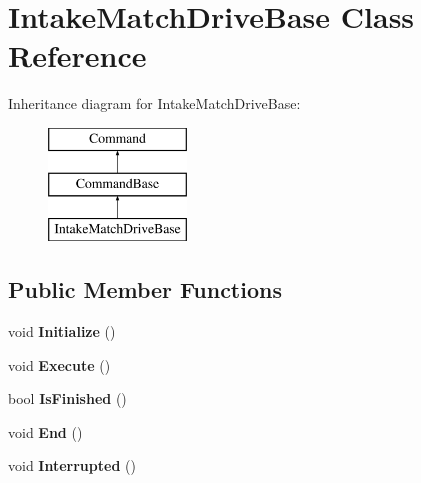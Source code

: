 \hypertarget{class_intake_match_drive_base}{}\section{Intake\+Match\+Drive\+Base Class Reference}
\label{class_intake_match_drive_base}
Inheritance diagram for Intake\+Match\+Drive\+Base\+:\begin{figure}[H]
\begin{center}
\leavevmode
\includegraphics[height=3.000000cm]{class_intake_match_drive_base}
\end{center}
\end{figure}
\subsection*{Public Member Functions}
\begin{DoxyCompactItemize}
\item 
\hypertarget{class_intake_match_drive_base_a6df8780272d10c34a1a013066ee1bb51}{}void {\bfseries Initialize} ()\label{class_intake_match_drive_base_a6df8780272d10c34a1a013066ee1bb51}

\item 
\hypertarget{class_intake_match_drive_base_a7faf75b0dcf853d5c5513be87ae44ee7}{}void {\bfseries Execute} ()\label{class_intake_match_drive_base_a7faf75b0dcf853d5c5513be87ae44ee7}

\item 
\hypertarget{class_intake_match_drive_base_a78228e3ae9123c9c4f02f7f227cae290}{}bool {\bfseries Is\+Finished} ()\label{class_intake_match_drive_base_a78228e3ae9123c9c4f02f7f227cae290}

\item 
\hypertarget{class_intake_match_drive_base_a1a039a7be99a2191de25731134989ab6}{}void {\bfseries End} ()\label{class_intake_match_drive_base_a1a039a7be99a2191de25731134989ab6}

\item 
\hypertarget{class_intake_match_drive_base_a460baf0b948a3a11cc61ac674078e83e}{}void {\bfseries Interrupted} ()\label{class_intake_match_drive_base_a460baf0b948a3a11cc61ac674078e83e}

\end{DoxyCompactItemize}
